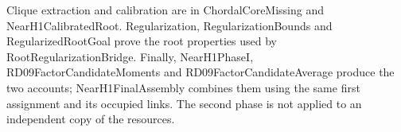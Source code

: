 \documentclass[english,11pt,a4paper]{article}
\begin{document}
Clique extraction and calibration are in {\ttfamily\small ChordalCoreM\discretionary{\hbox{\ensuremath{\hookrightarrow}}}{}{}issing} and {\ttfamily\small NearH1Calibr\discretionary{\hbox{\ensuremath{\hookrightarrow}}}{}{}atedRoot}. {\ttfamily\small Regularizati\discretionary{\hbox{\ensuremath{\hookrightarrow}}}{}{}on}, {\ttfamily\small Regularizati\discretionary{\hbox{\ensuremath{\hookrightarrow}}}{}{}onBounds} and {\ttfamily\small RegularizedR\discretionary{\hbox{\ensuremath{\hookrightarrow}}}{}{}ootGoal} prove the root properties used by {\ttfamily\small RootRegulari\discretionary{\hbox{\ensuremath{\hookrightarrow}}}{}{}zationBridge}. Finally, {\ttfamily\small NearH1PhaseI}, {\ttfamily\small RD09FactorCa\discretionary{\hbox{\ensuremath{\hookrightarrow}}}{}{}ndidateMomen\discretionary{\hbox{\ensuremath{\hookrightarrow}}}{}{}ts} and {\ttfamily\small RD09FactorCa\discretionary{\hbox{\ensuremath{\hookrightarrow}}}{}{}ndidateAvera\discretionary{\hbox{\ensuremath{\hookrightarrow}}}{}{}ge} produce the two accounts; {\ttfamily\small NearH1FinalA\discretionary{\hbox{\ensuremath{\hookrightarrow}}}{}{}ssembly} combines them using the same first assignment and its occupied links. The second phase is not applied to an independent copy of the resources.
\end{document}
